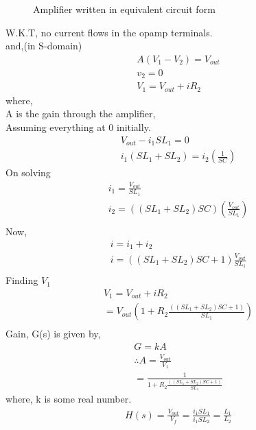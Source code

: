 \begin{enumerate}[label=\thesection.\arabic*.,ref=\thesection.\theenumi]
\begin{figure}[!ht]
\begin{center}
	\end{center}
\caption{Amplifier written in equivalent circuit form}
\label{fig:ee18btech11019_block3}
\end{figure}
W.K.T, no current flows in the opamp terminals.\\
and,(in S-domain)\\
\begin{align}
    A(V_1 - V_2) = V_{out}\\
    v_2 =0\\
    V_1 = V_{out} + iR_2
\end{align}
where,\\
A is the gain through the amplifier,\\
Assuming everything at 0 initially.\\
\begin{align}
    V_{out} - i_1SL_1 = 0\\
    i_1(SL_1 + SL_2) = i_2(\frac{1}{SC})
\end{align}
On solving\\
\begin{align}
    i_1 = \frac{V_{out}}{SL_1}\\
    i_2 = ((SL_1 + SL_2)SC)(\frac{V_{out}}{SL_1})\\
\end{align}
Now,\\
\begin{align}
    i = i_1 + i_2\\
    i = ((SL_1 + SL_2)SC + 1)\frac{V_{out}}{SL_1}\\
\end{align}
Finding $V_1$
\begin{align}
    V_1 = V_{out} + iR_2 \\
                = V_{out} ( 1 + R_2\frac{((SL_1 + SL_2)SC + 1)}{SL_1})\\
\end{align}
Gain, G(s) is given by,
\begin{align}
G = kA\\
\therefore A = \frac{V_{out}}{V_1}\\
    = \frac{1}{1 + R_2\frac{((SL_1 + SL_2)SC + 1)}{SL_1}}
\end{align}
where, k is some real number.\\
\begin{align}
H(s) = \frac{V_{out}}{V_{f}} =\frac{ i_1SL_1}{i_1SL_2}
    = \frac{L_1}{L_2}
\label{eq:ee18btech11019_B_gain}      
\end{align}




\end{enumerate}
